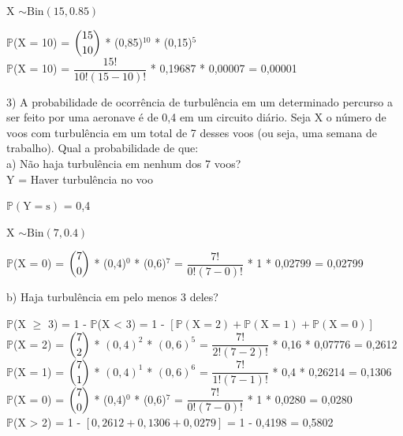 \documentclass[12pt,a4paper,draft]{article}
\begin{document}
	X $\sim \text{Bin}(15, 0.85)$
	\vspace{1cm}\\
	\begin{center}
		$\mathbb{P}$(X = 10) = $\dbinom{15}{10}$ * (0,85)$^{10}$ * (0,15)$^5$\\
		\vspace{0.25cm}
		$\mathbb{P}$(X = 10) = $\dfrac{15!}{10!(15-10)!}$ * 0,19687 * 0,00007 = 0,00001
	\end{center}
	\vspace{1cm}
	3) A probabilidade de ocorrência de turbulência em um determinado percurso a ser feito por uma aeronave é de 0,4 em um circuito diário. Seja X o número de voos	com turbulência em um total de 7 desses voos (ou seja, uma semana de trabalho). Qual a probabilidade de que:\\
	a) Não haja turbulência em nenhum dos 7 voos?
	\vspace{0.5cm}\\
	Y = Haver turbulência no voo
	\begin{center}
		\vspace{1cm}
		$\mathbb{P}\left(\text{Y} = \text{s}\right)$ = 0,4
		\vspace{1cm}\\
	\end{center}
	X $\sim \text{Bin}(7, 0.4)$
	\vspace{1cm}\\
	\begin{center}
		$\mathbb{P}$(X = 0) = $\dbinom{7}{0}$ * (0,4)$^{0}$ * (0,6)$^7$ = $\dfrac{7!}{0!(7-0)!}$ * 1 * 0,02799 = 0,02799
	\end{center}
	\vspace{1cm}
	b) Haja turbulência em pelo menos 3 deles?
	\vspace{0.5cm}\\
	\begin{center}
		$\mathbb{P}$(X $\geq$ 3) = 1 - $\mathbb{P}$(X < 3) = 1 - $\left[\mathbb{P}(\text{X} = 2) + \mathbb{P}(\text{X} = 1) + \mathbb{P}(\text{X} = 0)\right]$
		\vspace{0.5cm}\\
		$\mathbb{P}$(X = 2) = $\dbinom{7}{2}$ * $\left(0,4\right)^2$ * $\left(0,6\right)^5$ = $\dfrac{7!}{2!(7-2)!}$ * 0,16 * 0,07776 = 0,2612
		\vspace{0.5cm}\\
		$\mathbb{P}$(X = 1) = $\dbinom{7}{1}$ * $\left(0,4\right)^1$ * $\left(0,6\right)^6$ = $\dfrac{7!}{1!(7-1)!}$ * 0,4 * 0,26214 = 0,1306
		\vspace{0.5cm}\\
		$\mathbb{P}$(X = 0) = $\dbinom{7}{0}$ * (0,4)$^0$ * (0,6)$^7$ = $\dfrac{7!}{0!(7-0)!}$ * 1 * 0,0280 = 0,0280
		\vspace{0.5cm}\\
		$\mathbb{P}$(X > 2) = 1 - $\left[0,2612 + 0,1306 + 0,0279\right]$ = 1 - 0,4198 = 0,5802
	\end{center}
\end{document}
